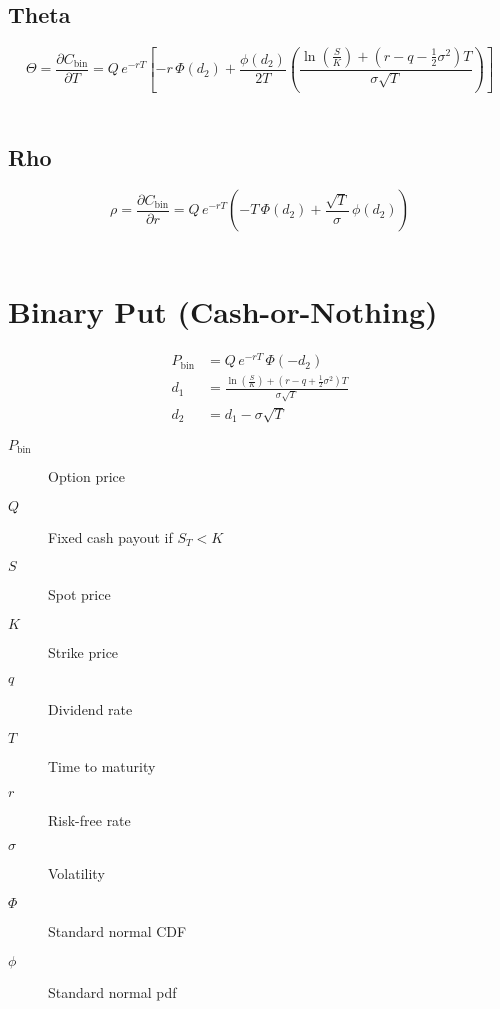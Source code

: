 \documentclass[12pt,a4paper]{article}
\begin{document}
\[
  \begin{aligned}
  \end{aligned}
\]

\subsection{Theta}
\[
  \boxed{\Theta = \frac{\partial C_{\mathrm{bin}}}{\partial T}
  = Q\, e^{-rT}\!\left[
  -r\,\Phi(d_2) 
  + \frac{\phi(d_2)}{2T}
    \left(
      \frac{\ln(\tfrac{S}{K}) + (r - q - \tfrac{1}{2}\sigma^2)T}{\sigma\sqrt{T}}
    \right)
  \right]}
\]

\[
  \begin{aligned}
  \end{aligned}
\]

\subsection{Rho}
\[
  \boxed{\rho = \frac{\partial C_{\mathrm{bin}}}{\partial r}
  = Q\, e^{-rT}\!\left(
    -T\,\Phi(d_2)
    + \frac{\sqrt{T}}{\sigma}\,\phi(d_2)
  \right)}
\]

\[
  \begin{aligned}
  \end{aligned}
\]

\newpage

\section{Binary Put (Cash-or-Nothing)}

\[
  \begin{aligned}
    P_{\mathrm{bin}} & = Q \, e^{-rT} \,\Phi(-d_2) \\ 
    d_1 & = \frac{\ln\!\left(\tfrac{S}{K}\right) + (r - q + \tfrac{1}{2}\sigma^2)T}{\sigma \sqrt{T}} \\
    d_2 & = d_1 - \sigma \sqrt{T}
  \end{aligned}
\]

\begin{description}
  \item[$P_{\mathrm{bin}}$] Option price
  \item[$Q$] Fixed cash payout if \( S_T < K \)
  \item[$S$] Spot price
  \item[$K$] Strike price
  \item[$q$] Dividend rate
  \item[$T$] Time to maturity
  \item[$r$] Risk-free rate
  \item[$\sigma$] Volatility
  \item[$\Phi$] Standard normal CDF
  \item[$\phi$] Standard normal pdf
\end{description}
\end{document}
